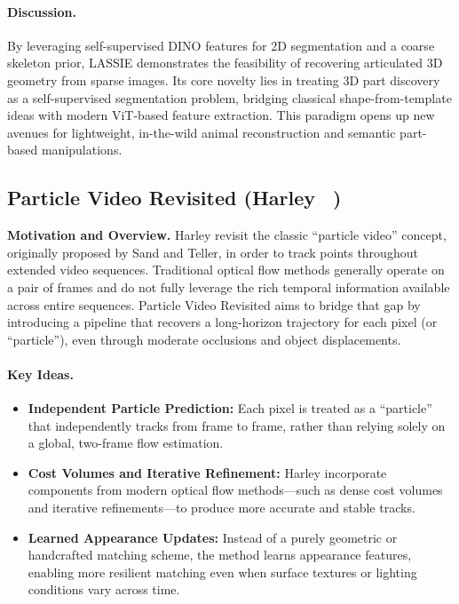 \documentclass[11pt]{article}
\begin{document}
\paragraph{Discussion.}
By leveraging self-supervised DINO features for 2D segmentation and a coarse skeleton prior, LASSIE demonstrates the feasibility of recovering articulated 3D geometry from sparse images. Its core novelty lies in treating 3D part discovery as a self-supervised segmentation problem, bridging classical shape-from-template ideas with modern ViT-based feature extraction. This paradigm opens up new avenues for lightweight, in-the-wild animal reconstruction and semantic part-based manipulations. 

\subsection{Particle Video Revisited (Harley \etal~\cite{harley2022particle})}
\textbf{Motivation and Overview.}
Harley \etal revisit the classic “particle video” concept, originally proposed by Sand and Teller, in order to track points throughout extended video sequences. Traditional optical flow methods generally operate on a pair of frames and do not fully leverage the rich temporal information available across entire sequences. Particle Video Revisited aims to bridge that gap by introducing a pipeline that recovers a long-horizon trajectory for each pixel (or “particle”), even through moderate occlusions and object displacements.

\paragraph{Key Ideas.}
\begin{itemize}
\item \textbf{Independent Particle Prediction:} Each pixel is treated as a “particle” that independently tracks from frame to frame, rather than relying solely on a global, two-frame flow estimation. 
\item \textbf{Cost Volumes and Iterative Refinement:} Harley \etal incorporate components from modern optical flow methods—such as dense cost volumes and iterative refinements—to produce more accurate and stable tracks.
\item \textbf{Learned Appearance Updates:} Instead of a purely geometric or handcrafted matching scheme, the method learns appearance features, enabling more resilient matching even when surface textures or lighting conditions vary across time.
\end{itemize}
\end{document}
